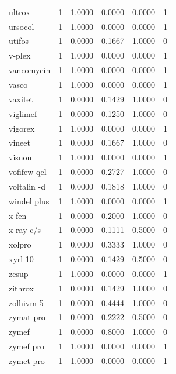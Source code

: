 \begin{longtable}{p{3.0cm}rrrrr}
ultrox & 1 & 1.0000 & 0.0000 & 0.0000 & 1 \\
ursocol & 1 & 1.0000 & 0.0000 & 0.0000 & 1 \\
utifos & 1 & 0.0000 & 0.1667 & 1.0000 & 0 \\
v-plex & 1 & 1.0000 & 0.0000 & 0.0000 & 1 \\
vancomycin & 1 & 1.0000 & 0.0000 & 0.0000 & 1 \\
vasco & 1 & 1.0000 & 0.0000 & 0.0000 & 1 \\
vaxitet & 1 & 0.0000 & 0.1429 & 1.0000 & 0 \\
viglimef & 1 & 0.0000 & 0.1250 & 1.0000 & 0 \\
vigorex & 1 & 1.0000 & 0.0000 & 0.0000 & 1 \\
vineet & 1 & 0.0000 & 0.1667 & 1.0000 & 0 \\
visnon & 1 & 1.0000 & 0.0000 & 0.0000 & 1 \\
vofifew qel & 1 & 0.0000 & 0.2727 & 1.0000 & 0 \\
voltalin -d & 1 & 0.0000 & 0.1818 & 1.0000 & 0 \\
windel plus & 1 & 1.0000 & 0.0000 & 0.0000 & 1 \\
x-fen & 1 & 0.0000 & 0.2000 & 1.0000 & 0 \\
x-ray c/s & 1 & 0.0000 & 0.1111 & 0.5000 & 0 \\
xolpro & 1 & 0.0000 & 0.3333 & 1.0000 & 0 \\
xyrl 10 & 1 & 0.0000 & 0.1429 & 0.5000 & 0 \\
zesup & 1 & 1.0000 & 0.0000 & 0.0000 & 1 \\
zithrox & 1 & 0.0000 & 0.1429 & 1.0000 & 0 \\
zolhivm 5 & 1 & 0.0000 & 0.4444 & 1.0000 & 0 \\
zymat pro & 1 & 0.0000 & 0.2222 & 0.5000 & 0 \\
zymef & 1 & 0.0000 & 0.8000 & 1.0000 & 0 \\
zymef pro & 1 & 1.0000 & 0.0000 & 0.0000 & 1 \\
zymet pro & 1 & 1.0000 & 0.0000 & 0.0000 & 1 \\
\end{longtable}
\endgroup
